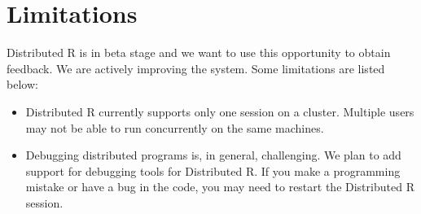 \documentclass[10pt, twocolumn]{article}
\begin{document}
\section{Limitations}

\begin{description}[style=nextline]
\item [What are the current limitations of Distributed R?] Distributed
  R is in beta stage and we want to use this opportunity to obtain
  feedback. We are actively improving the system. Some limitations are listed below:
\begin{itemize}
\item Distributed R currently supports only one session on a
  cluster. Multiple users may not be able to run concurrently on the
  same machines.
\item Debugging distributed programs is, in general, challenging. We
  plan to add support for debugging tools for Distributed R. If you
  make a programming mistake or have a bug in the code, you may need
  to restart the Distributed R session.
\end{itemize}

\balance
 
\end{description}
\end{document}
